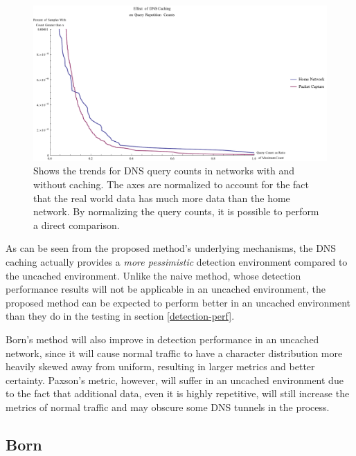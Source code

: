 \documentclass[12pt]{report}
\theoremstyle{remark}
\theoremstyle{definition}
\theoremstyle{definition}
\theoremstyle{definition}
\begin{document}
\begin{figure}[h]
\centering
\includegraphics[width=\textwidth]{figures/caching.pdf}
\caption[Effect of DNS Caching on Query Counts]{Shows the trends for DNS query
counts in networks with and without caching. The axes are normalized to account
for the fact that the real world data has much more data than the home network.
By normalizing the query counts, it is possible to perform a direct comparison.}
\label{caching}
\end{figure}

As can be seen from the proposed method's underlying mechanisms, the DNS caching
actually provides a \emph{more pessimistic} detection environment compared to
the uncached environment. Unlike the naive method, whose detection performance results
will not be applicable in an uncached environment, the proposed method can
be expected to perform better in an uncached environment than they do in the
testing in section \ref{detection-perf}.

Born's method will also improve in detection performance in an uncached network,
since it will cause normal traffic to have a character distribution more heavily
skewed away from uniform, resulting in larger metrics and better certainty.
Paxson's metric, however, will suffer in an uncached environment due to the fact
that additional data, even it is highly repetitive, will still increase the
metrics of normal traffic and may obscure some DNS tunnels in the process.

\subsection{Born}
\end{document}
